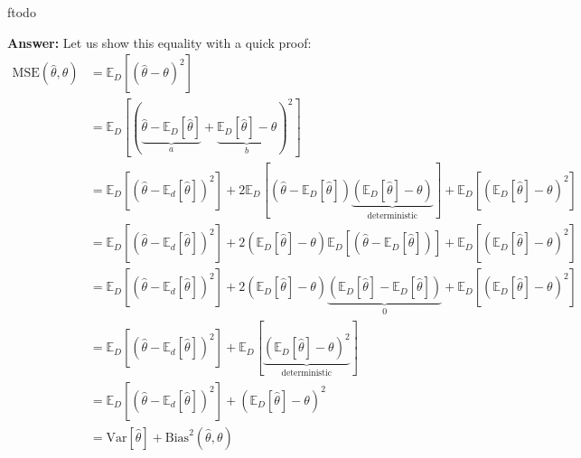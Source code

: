 ƒtodo\documentclass{article}
\newenvironment{QandA}{\begin{enumerate}[label=\arabic*.]}{\end{enumerate}}
\newenvironment{InnerQandA}{\begin{enumerate}[label=\roman*.]}{\end{enumerate}}
\newenvironment{answer}{\par\normalfont \textbf{Answer:}}{}
\begin{document}
\begin{QandA}
\begin{InnerQandA}
\begin{answer}
            Let us show this equality with a quick proof:
            \begin{align*}
                \text{MSE}\left(\hat{\theta}, \theta \right) &= \mathbb{E}_{D} \left[ (\hat{\theta} - \theta)^2\right] \\
                &= \mathbb{E}_{D} \left[\left(\underbrace{\hat{\theta} - \mathbb{E}_{D}\left[ \hat{\theta} \right]}_{a} + \underbrace{\mathbb{E}_{D}\left[ \hat{\theta} \right] - \theta}_{b}\right)^2\right] \\
                &= \mathbb{E}_{D} \left[ \left( \hat{\theta} - \mathbb{E}_{d}\left[ \hat{\theta} \right] \right)^2 \right] + 2 \mathbb{E}_D \left[ \left( \hat{\theta} - \mathbb{E}_D \left[ \hat{\theta} \right] \right) \underbrace{\left( \mathbb{E}_D \left[ \hat{\theta} \right] - \theta \right)}_{\text{deterministic}} \right] + \mathbb{E}_D \left[ \left( \mathbb{E}_D \left[ \hat{\theta} \right] - \theta \right)^2 \right] \\
                &= \mathbb{E}_{D} \left[ \left( \hat{\theta} - \mathbb{E}_{d}\left[ \hat{\theta} \right] \right)^2 \right] + 2 \left( \mathbb{E}_D \left[ \hat{\theta} \right] - \theta \right) \mathbb{E}_D \left[ \left( \hat{\theta} - \mathbb{E}_D \left[ \hat{\theta} \right] \right)  \right] + \mathbb{E}_D \left[ \left( \mathbb{E}_D \left[ \hat{\theta} \right] - \theta \right)^2 \right] \\
                &= \mathbb{E}_{D} \left[ \left( \hat{\theta} - \mathbb{E}_{d}\left[ \hat{\theta} \right] \right)^2 \right] + 2 \left( \mathbb{E}_D \left[ \hat{\theta} \right] - \theta \right)  \underbrace{\left( \mathbb{E}_D \left[\hat{\theta}\right] - \mathbb{E}_D \left[ \hat{\theta} \right] \right)}_{0} + \mathbb{E}_D \left[ \left( \mathbb{E}_D \left[ \hat{\theta} \right] - \theta \right)^2 \right] \\
                &= \mathbb{E}_{D} \left[ \left( \hat{\theta} - \mathbb{E}_{d}\left[ \hat{\theta} \right] \right)^2 \right] + \mathbb{E}_D \left[ \underbrace{ \left( \mathbb{E}_D \left[ \hat{\theta} \right] - \theta \right)^2}_{\text{deterministic}} \right] \\
                &= \mathbb{E}_{D} \left[ \left( \hat{\theta} - \mathbb{E}_{d}\left[ \hat{\theta} \right] \right)^2 \right] + \left( \mathbb{E}_D \left[ \hat{\theta} \right] - \theta \right)^2 \\
                &= \text{Var}\left[\hat{\theta}\right] + \text{Bias}^2 \left(\hat{\theta}, \theta \right)
            \end{align*}


\end{answer}
\end{InnerQandA}
\end{QandA}
\end{document}
